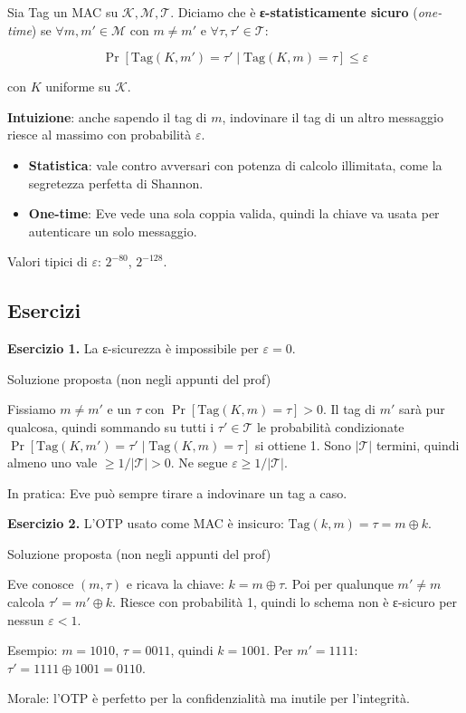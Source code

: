 Sia Tag un MAC su \(\mathcal{K}, \mathcal{M}, \mathcal{T}\). Diciamo che è \textbf{ε-statisticamente sicuro} (\emph{one-time}) se \(\forall m, m' \in \mathcal{M}\) con \(m \ne m'\) e \(\forall \tau, \tau' \in \mathcal{T}\):

\[
\Pr[\text{Tag}(K, m') = \tau' \mid \text{Tag}(K, m) = \tau] \le \varepsilon
\]

con \(K\) uniforme su \(\mathcal{K}\).

\textbf{Intuizione}: anche sapendo il tag di \(m\), indovinare il tag di un altro messaggio riesce al massimo con probabilità \(\varepsilon\).

\begin{itemize}
\tightlist
\item
  \textbf{Statistica}: vale contro avversari con potenza di calcolo illimitata, come la segretezza perfetta di Shannon.
\item
  \textbf{One-time}: Eve vede una sola coppia valida, quindi la chiave va usata per autenticare un solo messaggio.
\end{itemize}

Valori tipici di \(\varepsilon\): \(2^{-80}\), \(2^{-128}\).

\subsection{Esercizi}

\textbf{Esercizio 1.} La ε-sicurezza è impossibile per \(\varepsilon = 0\).

\begin{approfondimento}{Soluzione proposta (non negli appunti del prof)}

Fissiamo \(m \ne m'\) e un \(\tau\) con \(\Pr[\text{Tag}(K, m) = \tau] > 0\). Il tag di \(m'\) sarà pur qualcosa, quindi sommando su tutti i \(\tau' \in \mathcal{T}\) le probabilità condizionate \(\Pr[\text{Tag}(K, m') = \tau' \mid \text{Tag}(K, m) = \tau]\) si ottiene 1. Sono \(|\mathcal{T}|\) termini, quindi almeno uno vale \(\ge 1/|\mathcal{T}| > 0\). Ne segue \(\varepsilon \ge 1/|\mathcal{T}|\).

In pratica: Eve può sempre tirare a indovinare un tag a caso.

\end{approfondimento}

\textbf{Esercizio 2.} L'OTP usato come MAC è insicuro: \(\text{Tag}(k, m) = \tau = m \oplus k\).

\begin{approfondimento}{Soluzione proposta (non negli appunti del prof)}

Eve conosce \((m, \tau)\) e ricava la chiave: \(k = m \oplus \tau\). Poi per qualunque \(m' \ne m\) calcola \(\tau' = m' \oplus k\). Riesce con probabilità 1, quindi lo schema non è ε-sicuro per nessun \(\varepsilon < 1\).

Esempio: \(m = 1010\), \(\tau = 0011\), quindi \(k = 1001\). Per \(m' = 1111\): \(\tau' = 1111 \oplus 1001 = 0110\).

Morale: l'OTP è perfetto per la confidenzialità ma inutile per l'integrità.

\end{approfondimento}

